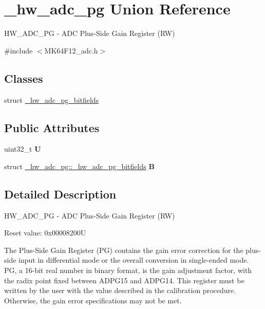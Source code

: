 \hypertarget{union__hw__adc__pg}{}\section{\+\_\+hw\+\_\+adc\+\_\+pg Union Reference}
\label{union__hw__adc__pg}


H\+W\+\_\+\+A\+D\+C\+\_\+\+PG -\/ A\+DC Plus-\/\+Side Gain Register (RW)  




{\ttfamily \#include $<$M\+K64\+F12\+\_\+adc.\+h$>$}

\subsection*{Classes}
\begin{DoxyCompactItemize}
\item 
struct \hyperlink{struct__hw__adc__pg_1_1__hw__adc__pg__bitfields}{\+\_\+hw\+\_\+adc\+\_\+pg\+\_\+bitfields}
\end{DoxyCompactItemize}
\subsection*{Public Attributes}
\begin{DoxyCompactItemize}
\item 
uint32\+\_\+t {\bfseries U}\hypertarget{union__hw__adc__pg_a6247621dd2feeea37520ad77ac4a350d}{}\label{union__hw__adc__pg_a6247621dd2feeea37520ad77ac4a350d}

\item 
struct \hyperlink{struct__hw__adc__pg_1_1__hw__adc__pg__bitfields}{\+\_\+hw\+\_\+adc\+\_\+pg\+::\+\_\+hw\+\_\+adc\+\_\+pg\+\_\+bitfields} {\bfseries B}\hypertarget{union__hw__adc__pg_a65b57500452d6923e1ec013ba50fad62}{}\label{union__hw__adc__pg_a65b57500452d6923e1ec013ba50fad62}

\end{DoxyCompactItemize}


\subsection{Detailed Description}
H\+W\+\_\+\+A\+D\+C\+\_\+\+PG -\/ A\+DC Plus-\/\+Side Gain Register (RW) 

Reset value\+: 0x00008200U

The Plus-\/\+Side Gain Register (PG) contains the gain error correction for the plus-\/side input in differential mode or the overall conversion in single-\/ended mode. PG, a 16-\/bit real number in binary format, is the gain adjustment factor, with the radix point fixed between A\+D\+P\+G15 and A\+D\+P\+G14. This register must be written by the user with the value described in the calibration procedure. Otherwise, the gain error specifications may not be met. 

